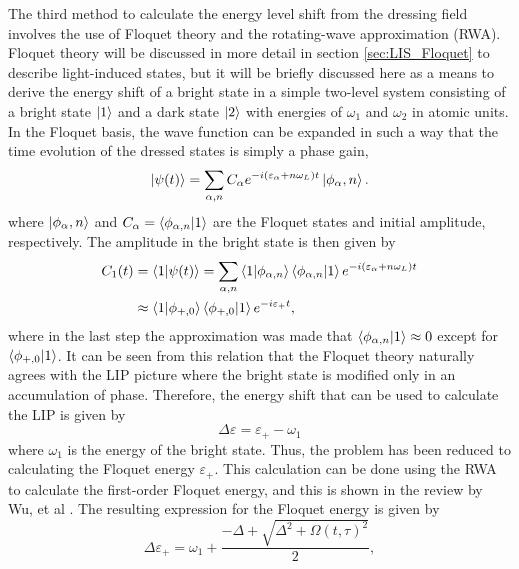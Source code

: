 The third method to calculate the energy level shift from the dressing field involves the use of Floquet theory and the rotating-wave approximation (RWA)\cite{wuTheoryStrongfieldAttosecond2016}.  Floquet theory will be discussed in more detail in section \ref{sec:LIS_Floquet} to describe light-induced states, but it will be briefly discussed here as a means to derive the energy shift of a bright state in a simple two-level system consisting of a bright state $\ket{1}$ and a dark state $\ket{2}$ with energies of $\omega_1$ and $\omega_2$ in atomic units.  In the Floquet basis, the wave function can be expanded in such a way that the time evolution of the dressed states is simply a phase gain,
\begin{equation}
	\ket{\psi(t)} = \sum_{\alpha,n}C_{\alpha}e^{-i(\varepsilon_\alpha+n\omega_L)t}\ket{\phi_\alpha,n}.
\end{equation}
where $\ket{\phi_\alpha,n}$ and $C_{\alpha}=\braket{\phi_{\alpha,n}|1}$ are the Floquet states and initial amplitude, respectively.  The amplitude  in the bright state is then given by 
\begin{equation}
	\begin{aligned}
		C_1(t)&=\braket{1|\psi(t)}=\sum_{\alpha,n}\braket{1|\phi_{\alpha,n}}\braket{\phi_{\alpha,n}|1}e^{-i(\varepsilon_\alpha+n\omega_L)t}\\
		&\approx \braket{1|\phi_{+,0}}\braket{\phi_{+,0}|1}e^{-i\varepsilon_{+} t},
	\end{aligned}
\end{equation}
where in the last step the approximation was made that $\braket{\phi_{\alpha,n}|1}\approx0$ except for $\braket{\phi_{+,0}|1}$.  It can be seen from this relation that the Floquet theory naturally agrees with the LIP picture where the bright state is modified only in an accumulation of phase.  Therefore, the energy shift that can be used to calculate the LIP is given by
\begin{equation}
	\Delta\varepsilon=\varepsilon_{+}-\omega_1
\end{equation}
where $\omega_1$ is the energy of the bright state.  Thus, the problem has been reduced to calculating the Floquet energy $\varepsilon_+$.  This calculation can be done using the RWA to calculate the first-order Floquet energy, and this is shown in the review by Wu, et al \cite{wuTheoryStrongfieldAttosecond2016}.  The resulting expression for the Floquet energy is given by
\begin{equation}
	\label{eqn:Floquet_energy_shift}
	\Delta\varepsilon_+ = \omega_1+\frac{-\Delta+\sqrt{\Delta^2+\Omega(t,\tau)^2}}{2},
\end{equation}

